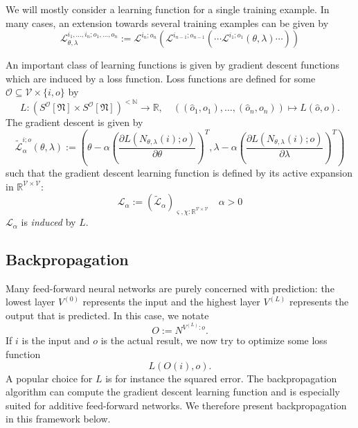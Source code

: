 \documentclass[a4paper,11pt]{report}
\newcommand{\const}{\varsigma} %
\newcommand{\var}{\chi} %
\begin{document}
\begin{Par}\label{training-extension}
We will mostly consider a learning function for a single training example. In many cases, an extension towards several training examples can be given by
\begin{equation}
\mathcal{L}^{i_1,\dotsc,i_n;o_1,\dotsc,o_n}_{\theta,\lambda}:=\mathcal{L}^{i_n;o_n}\left(\mathcal{L}^{i_{n-1};o_{n-1}}\left(\dotsb \mathcal{L}^{i_1;o_1}(\theta,\lambda)\dotsb\right)\right)
\end{equation}
\end{Par}

\begin{Par}
An important class of learning functions is given by gradient descent functions which are induced by a loss function. Loss functions are defined for some $\mathcal{O}\subseteq\mathcal{V}\times\{i,o\}$ by
\begin{equation}
L:\left(S^{\mathcal{O}}[\mathfrak{N}]\times S^{\mathcal{O}}[\mathfrak{N}]\right)^{<\mathbb{N}}\to\mathbb{R},
\quad
\left((\hat{o}_1,o_1),\dotsc,(\hat{o}_n,o_n)\right)\mapsto L\left(\hat{o},o\right).
\end{equation}
The gradient descent is given by
\[
\tilde{\mathcal{L}}_{\alpha}^{i;o}(\theta,\lambda):=\left(\theta-\alpha\left(\frac{\partial L\left(N_{\theta,\lambda}(i);o\right)}{\partial\theta}\right)^T,
\lambda-\alpha\left(\frac{\partial L\left(N_{\theta,\lambda}(i);o\right)}{\partial\lambda}\right)^T\right)
\]
such that the gradient descent learning function is defined by its active expansion in $\mathbb{R}^{\mathcal{V}\times\mathcal{V}}$:
\begin{equation}
\mathcal{L}_{\alpha}:=\left(\tilde{\mathcal{L}}_{\alpha}\right)_{\const,\var:\mathbb{R}^{\mathcal{V}\times\mathcal{V}}}
\quad
\alpha>0
\end{equation}
$\mathcal{L}_{\alpha}$ is \emph{induced} by $L$.
\end{Par}

\subsection{Backpropagation}\label{subsec:theory-learning-backprop}

\begin{Par}
Many feed-forward neural networks are purely concerned with prediction: the lowest layer $V^{(0)}$ represents the input and the highest layer $V^{(L)}$ represents the output that is predicted. In this case, we notate
\begin{equation}
O:=N^{V^{(L)}:o}.
\end{equation}
If $i$ is the input and $o$ is the actual result, we now try to optimize some loss function
\[
L\left(O(i),o\right).
\]
A popular choice for $L$ is for instance the squared error. The backpropagation algorithm can compute the gradient descent learning function and is especially suited for additive feed-forward networks. We therefore present backpropagation in this framework below.
\end{Par}
\end{document}
